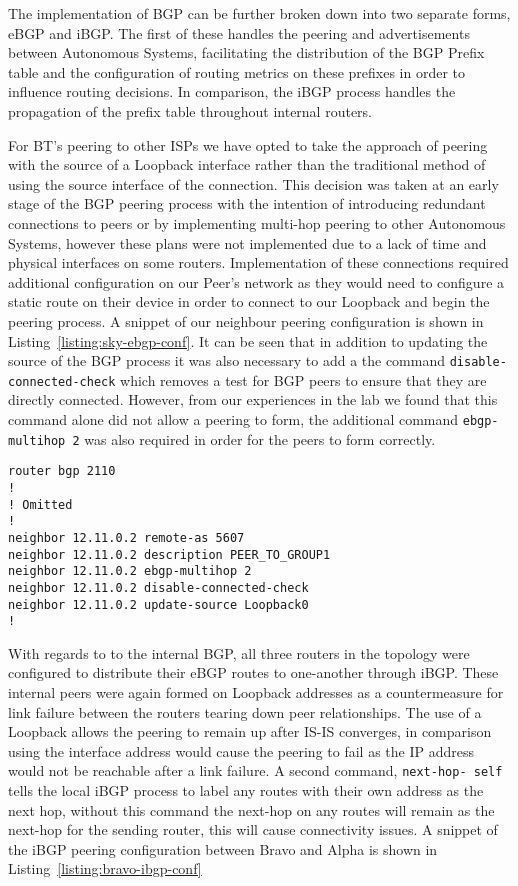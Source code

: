 The implementation of BGP can be further broken down into two separate forms,
eBGP and iBGP. The first of these handles the peering and advertisements between
Autonomous Systems, facilitating the distribution of the BGP Prefix table and
the configuration of routing metrics on these prefixes in order to influence
routing decisions. In comparison, the iBGP process handles the propagation of
the prefix table throughout internal routers.

For BT's peering to other ISPs we have opted to take the approach of peering
with the source of a Loopback interface rather than the traditional method of
using the source interface of the connection. This decision was taken at an
early stage of the BGP peering process with the intention of introducing
redundant connections to peers or by implementing multi-hop peering to other
Autonomous Systems, however these plans were not implemented due to a lack of
time and physical interfaces on some routers. Implementation of these
connections required additional configuration on our Peer's network as they
would need to configure a static route on their device in order to connect to
our Loopback and begin the peering process. A snippet of our neighbour peering
configuration is shown in Listing~\ref{listing:sky-ebgp-conf}. It can be seen
that in addition to updating the source of the BGP process it was also necessary
to add a the command \texttt{disable-connected-check} which removes a test for
BGP peers to ensure that they are directly connected. However, from our
experiences in the lab we found that this command alone did not allow a peering
to form, the additional command \texttt{ebgp-multihop 2} was also required in
order for the peers to form correctly.

\begin{lstlisting}[caption={BT-Sky eBGP Configuration}, label={listing:sky-ebgp-conf}]
router bgp 2110
!
! Omitted
!
neighbor 12.11.0.2 remote-as 5607
neighbor 12.11.0.2 description PEER_TO_GROUP1
neighbor 12.11.0.2 ebgp-multihop 2
neighbor 12.11.0.2 disable-connected-check
neighbor 12.11.0.2 update-source Loopback0
!
\end{lstlisting}

With regards to to the internal BGP, all three routers in the topology were
configured to distribute their eBGP routes to one-another through iBGP. These
internal peers were again formed on Loopback addresses as a countermeasure for
link failure between the routers tearing down peer relationships. The use of a
Loopback allows the peering to remain up after IS-IS converges, in comparison
using the interface address would cause the peering to fail as the IP address
would not be reachable after a link failure. A second command, \texttt{next-hop-
	self} tells the local iBGP process to label any routes with their own address as
the next hop, without this command the next-hop on any routes will remain as the
next-hop for the sending router, this will cause connectivity issues. A snippet
of the iBGP peering configuration between Bravo and Alpha is shown in
Listing~\ref{listing:bravo-ibgp-conf}


